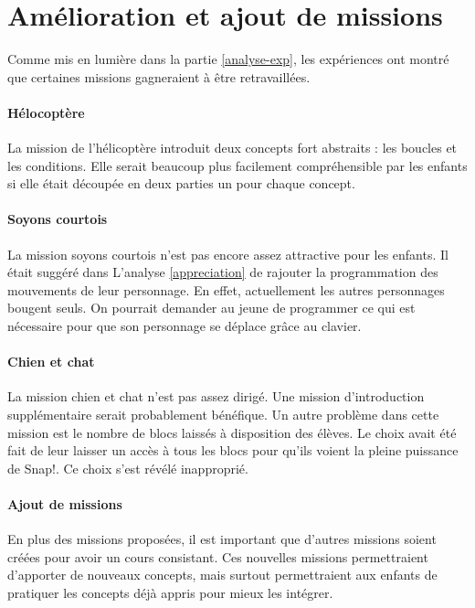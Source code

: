 \section{Amélioration et ajout de missions}
Comme mis en lumière dans la partie \ref{analyse-exp}, les expériences ont montré que certaines missions gagneraient à être retravaillées.

\paragraph{Hélocoptère}
La mission de l'hélicoptère introduit deux concepts fort abstraits : les boucles et les conditions. Elle serait beaucoup plus facilement compréhensible par les enfants si elle était découpée en deux parties un pour chaque concept.

\paragraph{Soyons courtois}
La mission soyons courtois n'est pas encore assez attractive pour les enfants. Il était suggéré dans L'analyse \ref{appreciation} de rajouter la programmation des mouvements de leur personnage. En effet, actuellement les autres personnages bougent seuls. On pourrait demander au jeune de programmer ce qui est nécessaire pour que son personnage se déplace grâce au clavier.

\paragraph{Chien et chat}
La mission chien et chat n'est pas assez dirigé. Une mission d'introduction supplémentaire serait probablement bénéfique. Un autre problème dans cette mission est le nombre de blocs laissés à disposition des élèves. Le choix avait été fait de leur laisser un accès à tous les blocs pour qu'ils voient la pleine puissance de Snap!. Ce choix s'est révélé inapproprié.

\paragraph{Ajout de missions}
En plus des missions proposées, il est important que d'autres missions soient créées pour avoir un cours consistant. Ces nouvelles missions permettraient d'apporter de nouveaux concepts, mais surtout permettraient aux enfants de pratiquer les concepts déjà appris pour mieux les intégrer.

